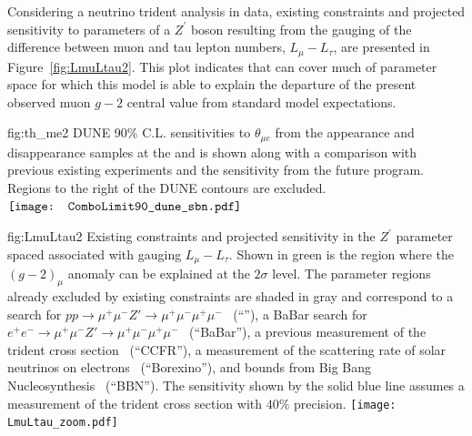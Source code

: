 Considering a neutrino trident analysis in  data, 
existing constraints and projected sensitivity to parameters of a $Z^\prime$ boson resulting from the gauging of the difference between 
muon and tau lepton numbers, $L_\mu - L_\tau$, are presented 
in Figure~\ref{fig:LmuLtau2}.  This plot indicates that  
can cover much of parameter space for which this model is 
able to explain the 
departure of the present observed muon $g-2$ central value 
from standard model expectations.


\begin{dunefigure}
{fig:th_me2}
{DUNE 90\% C.L. sensitivities to $\theta_{\mu e}$ from the appearance and disappearance samples at the  and  is shown along with a comparison with previous existing experiments and the sensitivity from the future  program. Regions to the right of the DUNE contours are excluded.}
$\vcenter{\hbox{\texttt{[image: ComboLimit90\_dune\_sbn.pdf]}}}$
\end{dunefigure}

\begin{dunefigure}
{fig:LmuLtau2}
{Existing constraints and projected  sensitivity in the $Z^\prime$ parameter spaced associated with gauging $L_\mu - L_\tau$. Shown in green is the region where the $(g-2)_\mu$ anomaly can be explained at the $2\sigma$ level. The parameter regions already excluded by existing constraints are shaded in gray and correspond to 
a  search for $pp \to \mu^+\mu^- Z' \to \mu^+\mu^-\mu^+\mu^-$~\cite{Sirunyan:2018nnz} (``''), 
a BaBar search for $e^+e^- \to \mu^+\mu^- Z' \to \mu^+\mu^-\mu^+\mu^-$~\cite{TheBABAR:2016rlg} (``BaBar''), 
a previous measurement of the trident cross section~\cite{Mishra:1991bv,Altmannshofer:2014pba} (``CCFR''), 
a measurement of the scattering rate of solar neutrinos on electrons~\cite{Bellini:2011rx,Harnik:2012ni,Agostini:2017ixy} (``Borexino''), 
and bounds from Big Bang Nucleosynthesis~\cite{Ahlgren:2013wba,Kamada:2015era} (``BBN''). The  sensitivity shown by the solid blue line assumes a measurement of the trident cross section with $40\%$ precision.}
\texttt{[image: LmuLtau\_zoom.pdf]}
\end{dunefigure}

